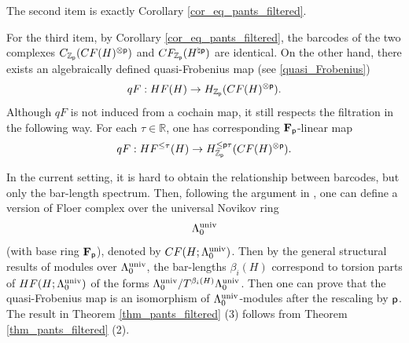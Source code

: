 \documentclass[reqno, 10pt]{amsart}
\numberwithin{equation}{section}
\numberwithin{equation}{section}
\theoremstyle{definition}
\theoremstyle{remark}
\newcommand{\beqn}{\begin{equation*}}
\newcommand{\eeqn}{\end{equation*}}
\newcommand{\mb}{\mathbb}
\newcommand{\p}{{\sf p}}
\newcommand{\fp}{{\bf F}_{\sf p}}
\newcommand{\zp}{{{\mb Z}_{\sf p}}}
\begin{document}
The second item is exactly Corollary \ref{cor_eq_pants_filtered}.

For the third item, by Corollary \ref{cor_eq_pants_filtered}, the barcodes of the two complexes $C_{\zp}(CF(H)^{\otimes \p})$ and $CF_{\zp}(H^{\natural \p})$ are identical. On the other hand, there exists an algebraically defined quasi-Frobenius map (see \eqref{quasi_Frobenius})
\beqn
qF: HF(H) \to H_{\zp}(CF(H)^{\otimes \p}).
\eeqn
Although $qF$ is not induced from a cochain map, it still respects the filtration in the following way. For each $\tau \in {\mb R}$, one has corresponding $\fp$-linear map
\beqn
qF: HF^{\leq \tau}(H) \to H_{\zp}^{\leq \p \tau} (CF(H)^{\otimes \p}).
\eeqn

In the current setting, it is hard to obtain the relationship between barcodes, but only the bar-length spectrum. Then, following the argument in \cite[Section 6.2]{shelukhin-22}, one can define a version of Floer complex over the universal Novikov ring
\beqn
\Lambda_0^{\rm univ}
\eeqn
(with base ring $\fp$), denoted by $CF(H; \Lambda_0^{\rm univ})$. Then by the general structural results of modules over $\Lambda_0^{\rm univ}$, the bar-lengths $\beta_i(H)$ correspond to torsion parts of $HF(H; \Lambda_0^{\rm univ})$ of the forms $\Lambda_0^{\rm univ}/ T^{\beta_i(H)} \Lambda_0^{\rm univ}$. Then one can prove that the quasi-Frobenius map is an isomorphism of $\Lambda_0^{\rm univ}$-modules after the rescaling by $\p$. The result in Theorem \ref{thm_pants_filtered} (3) follows from Theorem \ref{thm_pants_filtered} (2).
\end{document}
